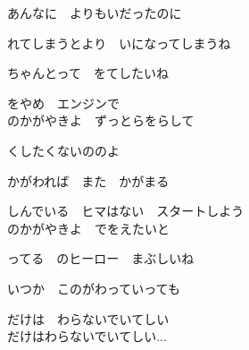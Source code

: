 {あんなに　よりもいだったのに

れてしまうとより　いになってしまうね

ちゃんとって　をてしたいね

をやめ　エンジンで
\\

のかがやきよ　ずっとらをらして

くしたくないののよ

かがわれば　また　かがまる

しんでいる　ヒマはない　スタートしよう
\\

のかがやきよ　でをえたいと

ってる　のヒーロー　まぶしいね

いつか　このがわっていっても

だけは　わらないでいてしい
\\

だけはわらないでいてしい...

}